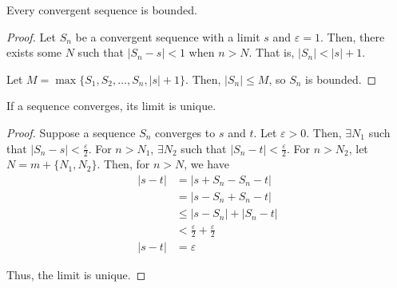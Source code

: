 \begin{theorem}{}{}
    Every convergent sequence is bounded.
\end{theorem}
\begin{proof}
    Let $S_n$ be a convergent sequence with a limit $s$ and $\varepsilon = 1$. Then, there exists some $N$ such that $|S_n - s| < 1$ when $n > N$. That is, $|S_n| < |s| + 1$.

    Let $M = \max\{S_1, S_2, \ldots, S_n, |s| + 1\}$. Then, $|S_n| \leq M$, so $S_n$ is bounded.
\end{proof}

\begin{theorem}{}{}
    If a sequence converges, its limit is unique.
\end{theorem}
\begin{proof}
    Suppose a sequence $S_n$ converges to $s$ and $t$. Let $\varepsilon > 0$. Then, $\exists N_1$ such that $|S_n - s| < \frac{\varepsilon}{2}$. For $n > N_1$, $\exists N_2$ such that $|S_n - t| < \frac{\varepsilon}{2}$. For $n > N_2$, let $N = m + \{N_1, N_2\}$. Then, for $n > N$, we have
    \begin{align*}
        |s - t| &= |s + S_n - S_n - t| \\
        &= |s - S_n + S_n - t| \\
        &\leq |s - S_n| + |S_n - t| \\
        &< \frac{\varepsilon}{2} + \frac{\varepsilon}{2} \\
        |s - t| &= \varepsilon
    \end{align*}

    Thus, the limit is unique.
\end{proof}